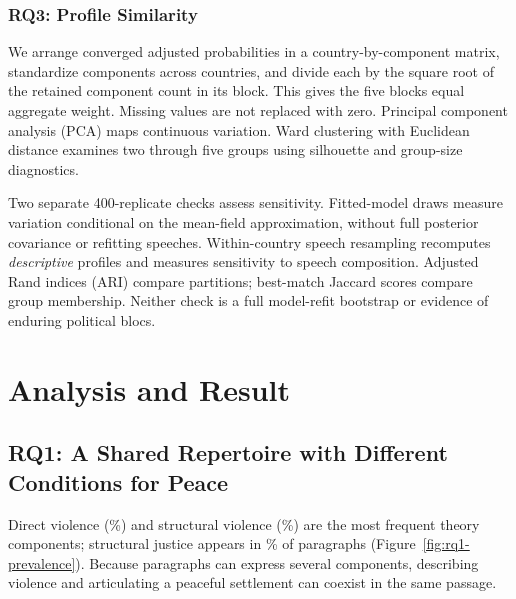 \documentclass[sigconf,review,anonymous,balance=false]{acmart}
\begin{document}
\subsubsection{RQ3: Profile Similarity}
We arrange converged adjusted probabilities in a country-by-component matrix,
standardize components across countries, and divide each by the square root of
the retained component count in its block. This gives the five blocks equal
aggregate weight. Missing values are not replaced with zero.
Principal component analysis (PCA) maps continuous variation. Ward clustering
with Euclidean distance examines two through five groups using silhouette
and group-size diagnostics.

Two separate 400-replicate checks assess sensitivity. Fitted-model draws
measure variation conditional on the mean-field approximation, without
full posterior covariance or refitting speeches. Within-country speech
resampling recomputes \emph{descriptive} profiles and measures sensitivity
to speech composition. Adjusted Rand indices (ARI) compare partitions;
best-match Jaccard scores compare group membership. Neither check is a
full model-refit bootstrap or evidence of enduring political blocs.

\section{Analysis and Result}
\subsection{RQ1: A Shared Repertoire with Different Conditions for Peace}
Direct violence (\PrevVD{}\%) and structural violence (\PrevVS{}\%) are the most
frequent theory components; structural justice appears in \PrevPNThree{}\% of paragraphs
(Figure~\ref{fig:rq1-prevalence}). Because paragraphs can express several
components, describing violence and articulating a peaceful settlement can
coexist in the same passage.
\end{document}
